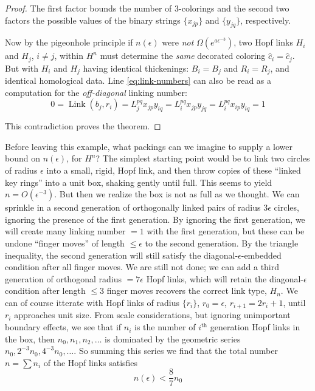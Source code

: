 \documentclass[12pt]{amsart}
\theoremstyle{definition}
\theoremstyle{remark}
\begin{document}
\begin{proof}
	The first factor bounds the number of 3-colorings and the second two factors the possible values of the binary strings $\{x_{jp}\}$ and $\{y_{jq}\}$, respectively.

	Now by the pigeonhole principle if $n(\epsilon)$ were \emph{not} $\Omega(e^{a\epsilon^{-3}})$, two Hopf links $H_i$ and $H_j$, $i \neq j$, within $H^n$ must determine the \emph{same} decorated coloring $\hat{c}_i = \hat{c}_j$. But with $H_i$ and $H_j$ having identical thickenings: $B_i = B_j$ and $R_i = R_j$, and identical homological data. Line \ref{eq:link-numbers} can also be read as a computation for the \emph{off-diagonal} linking number:
	\begin{equation}
		0 = \operatorname{Link}(b_j, r_i) = L_j^{pq}x_{jp}y_{iq} = L_i^{pq}x_{jp}y_{jq} = L_i^{pq}x_{ip}y_{iq} = 1
	\end{equation}

	This contradiction proves the theorem.
\end{proof}

Before leaving this example, what packings can we imagine to supply a lower bound on $n(\epsilon)$, for $H^n$? The simplest starting point would be to link two circles of radius $\epsilon$ into a small, rigid, Hopf link, and then throw copies of these ``linked key rings'' into a unit box, shaking gently until full. This seems to yield $n = O(\epsilon^{-3})$. But then we realize the box is not as full as we thought. We can sprinkle in a second generation of orthogonally linked pairs of radius $3\epsilon$ circles, ignoring the presence of the first generation. By ignoring the first generation, we will create many linking number $=1$ with the first generation, but these can be undone ``finger moves'' of length $\leq \epsilon$ to the second generation. By the triangle inequality, the second generation will still satisfy the diagonal-$\epsilon$-embedded condition after all finger moves. We are still not done; we can add a third generation of orthogonal radius $= 7 \epsilon$ Hopf links, which will retain the diagonal-$\epsilon$ condition after length $\leq 3$ finger moves recovers the correct link type, $H_n$. We can of course itterate with Hopf links of radius $\{r_i\}$, $r_0 = \epsilon$, $r_{i+1} = 2r_i + 1$, until $r_i$ approaches unit size. From scale considerations, but ignoring unimportant boundary effects, we see that if $n_i$ is the number of $i^{\text{th}}$ generation Hopf links in the box, then $n_0, n_1, n_2, \dots$ is dominated by the geometric series $n_0, 2^{-3}n_0, 4^{-3}n_0, \dots$. So summing this series we find that the total number $n = \sum n_i$ of the Hopf links satisfies
\begin{equation}
	n(\epsilon) < \frac{8}{7} n_0
\end{equation}
\end{document}
